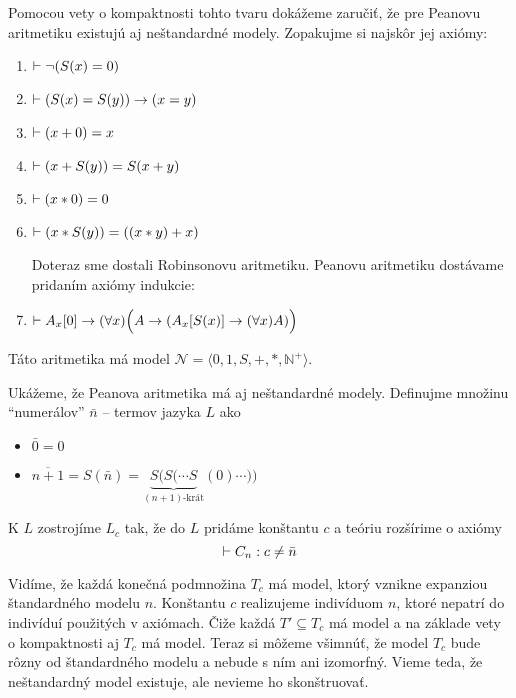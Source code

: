 \begin{priklad}
    Pomocou vety o kompaktnosti tohto tvaru dokážeme zaručiť,
    že pre Peanovu aritmetiku existujú aj neštandardné modely.
    Zopakujme si najskôr jej axiómy:

    \begin{enumerate}
    \item $\vdash \neg (S(x) = 0)$
    \item $\vdash (S(x) = S(y)) \rightarrow (x=y)$
    \item $\vdash (x+0) = x$
    \item $\vdash (x+S(y)) = S(x+y)$
    \item $\vdash (x * 0) = 0$
    \item $\vdash (x * S(y)) = ((x*y)+x)$
    \par \noindent Doteraz sme dostali Robinsonovu aritmetiku. Peanovu
    aritmetiku dostávame pridaním axiómy indukcie:
    \item $\vdash A_x[0] \rightarrow (\forall x)\Big(A \rightarrow (
            A_x[S(x)] \rightarrow (\forall x)A)\Big)$
    \end{enumerate}
    Táto aritmetika má model 
    $\mathcal{N} = \langle 0,1,S,+,*,\mathbb{N}^+ \rangle$.

    Ukážeme, že Peanova aritmetika má aj neštandardné modely.
    Definujme množinu ``numerálov'' $\bar{n}$ -- termov jazyka $L$ ako
    \begin{itemize}
    \item $\bar{0} = 0$
    \item $\overline{n+1} = S(\bar{n}) = 
        \underbrace{S(S( \cdots S}_{(n+1)\mbox{-krát}}(0) \cdots ))$
    \end{itemize}

    K $L$ zostrojíme $L_c$ tak, že do $L$ pridáme konštantu $c$ a
    teóriu rozšírime o axiómy
    \begin{equation*}
        \vdash C_n: c \not= \bar{n}
    \end{equation*}

    Vidíme, že každá konečná podmnožina $T_c$ má model,
    ktorý vznikne expanziou štandardného modelu $n$.
    Konštantu $c$ realizujeme indivíduom $n$, ktoré nepatrí do
    indivíduí použitých v axiómach.
    Čiže každá $T' \subseteq T_c$ má model a na základe vety o kompaktnosti 
    aj $T_c$ má model. Teraz si môžeme všimnúť, že model $T_c$ bude rôzny
    od štandardného modelu a nebude s ním ani izomorfný.
    Vieme teda, že neštandardný model existuje, ale nevieme ho skonštruovať.
\end{priklad}
